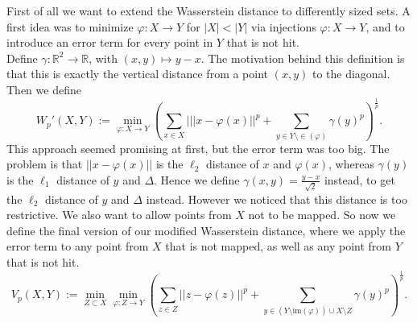 \documentclass[11pt, a4paper, UKenglish]{article}
\newcommand{\bR}{\mathbb{R}}
\newcommand{\im}{\textrm{im}}
\begin{document}
    First of all we want to extend the Wasserstein distance to differently sized sets.
    A first idea was to minimize $\varphi:X\rightarrow Y$ for $|X|<|Y|$ via injections $\varphi:X\rightarrow Y$, and to introduce an error term for every point in $Y$ that is not hit.\\
    Define $\gamma:\bR^2\rightarrow\bR$, with $(x,y)\mapsto y-x$.
    The motivation behind this definition is that this is exactly the vertical distance from a point $(x,y)$ to the diagonal.
    Then we define \[W_p'(X,Y):=\min_{\varphi:X\rightarrow Y}\left(\sum_{x\in X}|||x-\varphi(x)||^p + \sum_{y\in Y\setminus \in(\varphi)}\gamma(y)^p\right)^\frac{1}{p}.\]
    This approach seemed promising at first, but the error term was too big.
    The problem is that $||x-\varphi(x)||$ is the $\ell_2$ distance of $x$ and $\varphi(x)$, whereas $\gamma(y)$ is the $\ell_1$ distance of $y$ and $\Delta$.
    Hence we define $\gamma(x,y)=\frac{y-x}{\sqrt{2}}$ instead, to get the $\ell_2$ distance of $y$ and $\Delta$ instead.
    However we noticed that this distance is too restrictive.
    We also want to allow points from $X$ not to be mapped.
    So now we define the final version of our modified Wasserstein distance, where we apply the error term to any point from $X$ that is not mapped, as well as any point from $Y$ that is not hit.
    \[V_p(X,Y):=\min_{Z\subset{X}}\min_{\varphi:Z\rightarrow Y}\left(\sum_{z\in Z}||z-\varphi(z)||^p + \sum_{y\in (Y\setminus \im(\varphi))\cup X\setminus Z}\gamma(y)^p\right)^\frac{1}{p}.\]
\end{document}
